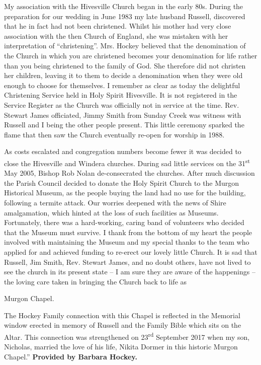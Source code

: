 My association with the Hivesville Church began in the early 80s. During the preparation for our wedding in June 1983 my late husband Russell, discovered that he in fact had not been christened. Whilst his mother had very close association with the then Church of England, she was mistaken with her interpretation of ``christening''. Mrs. Hockey believed that the denomination of the Church in which you are christened becomes your denomination for life rather than you being christened to the family of God. She therefore did not christen her children, leaving it to them to decide a denomination when they were old enough to choose for themselves. I remember as clear as today the delightful Christening Service held in Holy Spirit Hivesville. It is not registered in the Service Register as the Church was officially not in service at the time. Rev. Stewart James officiated, Jimmy Smith from Sunday Creek was witness with Russell and I being the other people present. This little ceremony sparked the flame that then saw the Church eventually re-open for worship in 1988.



As costs escalated and congregation numbers become fewer it was decided to close the Hivesville and Windera churches. During sad little services on the 31\textsuperscript{st} May 2005, Bishop Rob Nolan de-consecrated the churches. After much discussion the Parish Council decided to donate the Holy Spirit Church to the Murgon Historical Museum, as the people buying the land had no use for the building, following a termite attack. Our worries deepened with the news of Shire amalgamation, which hinted at the loss of such facilities as Museums. Fortunately, there was a hard-working, caring band of volunteers who decided that the Museum must survive. I thank from the bottom of my heart the people involved with maintaining the Museum and my special thanks to the team who applied for and achieved funding to re-erect our lovely little Church. It is sad that Russell, Jim Smith, Rev. Stewart James, and no doubt others, have not lived to see the church in its present state -- I am sure they are aware of the happenings -- the loving care taken in bringing the Church back to life as



Murgon Chapel.



The Hockey Family connection with this Chapel is reflected in the Memorial window erected in memory of Russell and the Family Bible which sits on the Altar. This connection was strengthened on 23\textsuperscript{rd} September 2017 when my son, Nicholas, married the love of his life, Nikita Dormer in this historic Murgon Chapel.'' \textbf{Provided by Barbara Hockey.}





